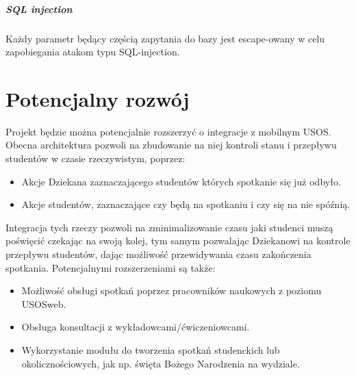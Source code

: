 \documentclass[licencjacka]{pracamgr}
\begin{document}
\paragraph{SQL injection}
Każdy parametr będący częścią zapytania do bazy jest escape-owany w celu zapobiegania atakom typu SQL-injection.




\chapter{Potencjalny rozwój}  \label{chap:rozwoj}

Projekt będzie można potencjalnie rozszerzyć o integracje z mobilnym USOS. Obecna architektura pozwoli na zbudowanie na niej kontroli stanu i przepływu studentów w czasie rzeczywistym, poprzez:
\begin{itemize}
	\item Akcje Dziekana zaznaczającego studentów których spotkanie się już odbyło.
	\item Akcje studentów, zaznaczające czy będą na spotkaniu i czy się na nie spóźnią.
\end{itemize}
Integracja tych rzeczy pozwoli na zminimalizowanie czasu jaki studenci muszą poświęcić czekając na swoją kolej, tym samym pozwalając Dziekanowi na kontrole przepływu studentów, dając możliwość przewidywania czasu zakończenia spotkania. Potencjalnymi rozszerzeniami są także:
\begin{itemize}
	\item Możliwość obsługi spotkań poprzez pracowników naukowych z poziomu USOSweb.
	\item Obsługa konsultacji z wykładowcami/ćwiczeniowcami.
	\item Wykorzystanie modułu do tworzenia spotkań studenckich lub okolicznościowych, jak np. święta Bożego Narodzenia na wydziale.
\end{itemize}
\end{document}
